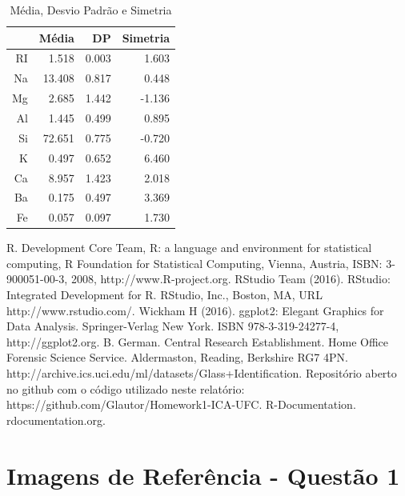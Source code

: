 \documentclass[conference]{IEEEtran}
\begin{document}
\begin{table}[h]
\centering
\caption{Média, Desvio Padrão e Simetria}
\vspace{0.5cm}
\begin{tabular}{r|r|r|r}
 
& Média & DP & Simetria \\
\hline
RI & 1.518 & 0.003 & 1.603 \\
Na & 13.408 & 0.817 & 0.448 \\
Mg & 2.685 & 1.442 & -1.136 \\
Al & 1.445 & 0.499 & 0.895 \\
Si & 72.651 & 0.775 & -0.720 \\
K & 0.497 & 0.652 & 6.460 \\
Ca & 8.957 & 1.423 & 2.018 \\
Ba & 0.175 & 0.497 & 3.369 \\
Fe & 0.057 & 0.097 & 1.730 \\
 
\end{tabular}
\end{table}

\newpage %

\begin{thebibliography}{00}
 R. Development Core Team, R: a language and environment for statistical computing, R Foundation for Statistical Computing, Vienna, Austria, ISBN: 3-900051-00-3, 2008, http://www.R-project.org.
 RStudio Team (2016). RStudio: Integrated Development for R. RStudio, Inc., Boston, MA, URL http://www.rstudio.com/.
 Wickham H (2016). ggplot2: Elegant Graphics for Data Analysis. Springer-Verlag New York. ISBN 978-3-319-24277-4, http://ggplot2.org.
 B. German. Central Research Establishment. Home Office Forensic Science Service. Aldermaston, Reading, Berkshire RG7 4PN. http://archive.ics.uci.edu/ml/datasets/Glass+Identification.
 Repositório aberto no github com o código utilizado neste relatório: https://github.com/Glautor/Homework1-ICA-UFC.
 R-Documentation. rdocumentation.org.
\end{thebibliography}
\vspace{12pt}

\newpage %
\section{Imagens de Referência - Questão 1}
\end{document}
